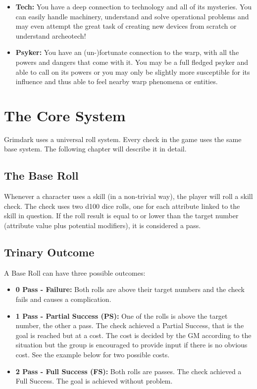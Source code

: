 \begin{itemize}
	\item \textbf{Tech:} You have a deep connection to technology and all of its mysteries. You can easily handle machinery, understand and solve operational problems and may even attempt the great task of creating new devices from scratch or understand archeotech!
	\item \textbf{Psyker:} You have an (un-)fortunate connection to the warp, with all the powers and dangers that come with it. You may be a full fledged psyker and able to call on its powers or you may only be slightly more susceptible for its influence and thus able to feel nearby warp phenomena or entities.
\end{itemize}




\section{The Core System} %
\label{sec:base_system}
Grimdark uses a universal roll system. Every check in the game uses the same base system. The following chapter will describe it in detail.
\subsection{The Base Roll}
Whenever a character uses a skill (in a non-trivial way), the player will roll a skill check.
The check uses two d100 dice rolls, one for each attribute linked to the skill in question.
If the roll result is equal to or lower than the target number (attribute value plus potential modifiers), it is considered a pass.

\subsection{Trinary Outcome}
A Base Roll can have three possible outcomes: \\
\begin{itemize}
	\item \textbf{0 Pass - Failure:} Both rolls are above their target numbers and the check fails and causes a complication.
	\item \textbf{1 Pass - Partial Success (PS):} One of the rolls is above the target number, the other a pass. The check achieved a Partial Success, that is the goal is reached but at a cost. The cost is decided by the GM according to the situation but the group is encouraged to provide input if there is no obvious cost. See the example below for two possible costs.
	\item \textbf{2 Pass - Full Success (FS):} Both rolls are passes. The check achieved a Full Success. The goal is achieved without problem.
\end{itemize}

